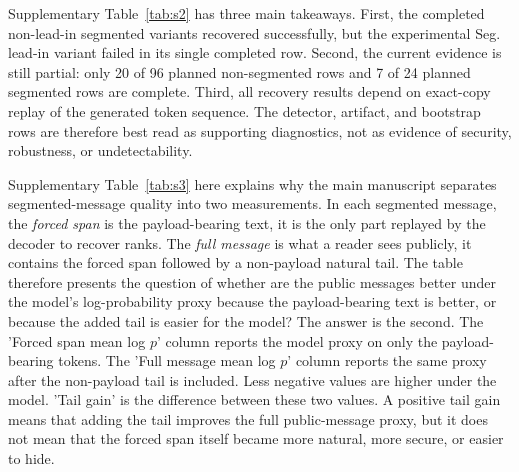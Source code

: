 \documentclass[fleqn,10pt]{wlscirep}
\begin{document}
Supplementary Table~\ref{tab:s2} has three main takeaways. First, the completed non-lead-in segmented variants recovered successfully, but the experimental Seg. lead-in variant failed in its single completed row. Second, the current evidence is still partial: only 20 of 96 planned non-segmented rows and 7 of 24 planned segmented rows are complete. Third, all recovery results depend on exact-copy replay of the generated token sequence. The detector, artifact, and bootstrap rows are therefore best read as supporting diagnostics, not as evidence of security, robustness, or undetectability.

Supplementary Table~\ref{tab:s3} here explains why the main manuscript separates segmented-message quality into two measurements. In each segmented message, the \emph{forced span} is the payload-bearing text, it is the only part replayed by the decoder to recover ranks. The \emph{full message} is what a reader sees publicly, it contains the forced span followed by a non-payload natural tail. The table therefore presents the question of whether are the public messages better under the model's log-probability proxy because the payload-bearing text is better, or because the added tail is easier for the model?
The answer is the second. The 'Forced span mean log \(p\)' column reports the model proxy on only the payload-bearing tokens. The 'Full message mean log \(p\)' column reports the same proxy after the non-payload tail is included. Less negative values are higher under the model. 'Tail gain' is the difference between these two values. A positive tail gain means that adding the tail improves the full public-message proxy, but it does not mean that the forced span itself became more natural, more secure, or easier to hide.
\end{document}
